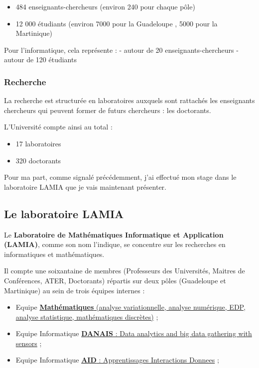 \begin{itemize}
\tightlist
\item
  484 enseignants-chercheurs (environ 240 pour chaque pôle)
\item
  12 000 étudiants (environ 7000 pour la Guadeloupe , 5000 pour la
  Martinique)
\end{itemize}

Pour l'informatique, cela représente : - autour de 20
enseignants-chercheurs - autour de 120 étudiants

\hypertarget{recherche}{%
\subsubsection{Recherche}\label{recherche}}

La recherche est structurée en laboratoires auxquels sont rattachés les
enseignants chercheurs qui peuvent former de futurs chercheurs : les
doctorants.

L'Université compte ainsi au total :

\begin{itemize}
\tightlist
\item
  17 laboratoires
\item
  320 doctorants
\end{itemize}

Pour ma part, comme signalé précédemment, j'ai effectué mon stage dans
le laboratoire LAMIA que je vais maintenant présenter.

\hypertarget{le-lamia}{%
\subsection{Le laboratoire LAMIA}\label{le-lamia}}

Le \textbf{Laboratoire de Mathématiques Informatique et Application
(LAMIA)}, comme son nom l'indique, se concentre sur les recherches en
informatiques et mathématiques.

Il compte une soixantaine de membres (Professeurs des Universités,
Maitres de Conférences, ATER, Doctorants) répartis sur deux pôles
(Guadeloupe et Martinique) au sein de trois équipes internes :

\begin{itemize}
\tightlist
\item
  Equipe
  \href{http://lamia.univ-ag.fr/index.php?page=equipe-mathematiques}{\textbf{Mathématiques}
  (analyse variationnelle, analyse numérique, EDP, analyse statistique,
  mathématiques discrètes)} ;
\item
  Equipe Informatique
  \href{http://lamia.univ-ag.fr/index.php?page=equipe-danais}{\textbf{DANAIS}
  : Data analytics and big data gathering with sensors} ;
\item
  Equipe Informatique
  \href{http://lamia.univ-ag.fr/index.php?page=equipe-aid}{\textbf{AID}
  : Apprentissages Interactions Donnees} ;
\end{itemize}

